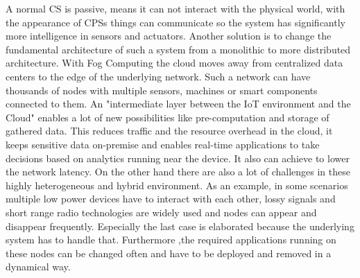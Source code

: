 A normal \ac{CS} is passive, means it can not interact with the physical world, with the appearance of \acp{CPS} things can communicate so the system has significantly more intelligence in sensors and actuators.\autocite[cf.][p. 1363 f.]{Poovendran:2010}
\newpage
Another solution is to change the fundamental architecture of such a system from a monolithic to more distributed architecture.
With Fog Computing the cloud moves away from centralized data centers to the edge of the underlying network.\autocite[cf.][p. 380]{Pahl:2015}
Such a network can have thousands of nodes with multiple sensors, machines or smart components connected to them.
An "intermediate layer between the IoT environment and the Cloud"\autocite[p.236]{Brito:2016} enables a lot of new possibilities like pre-computation and storage of gathered data.
This reduces traffic and the resource overhead in the cloud, it keeps sensitive data on-premise\autocite[cf.][p.236]{Brito:2016} and enables real-time applications to take decisions based on analytics running near the device.
It also can achieve to lower the network latency.
On the other hand there are also a lot of challenges in these highly heterogeneous and hybrid environment.
As an example, in some scenarios multiple low power devices have to interact with each other, lossy signals and short range radio technologies are widely used and nodes can appear and disappear frequently.\autocite[cf.][p. 325]{Yannuzzi:2014}
Especially the last case is elaborated because the underlying system has to handle that.
Furthermore ,the required applications running on these nodes can be changed often and have to be deployed and removed in a dynamical way.

